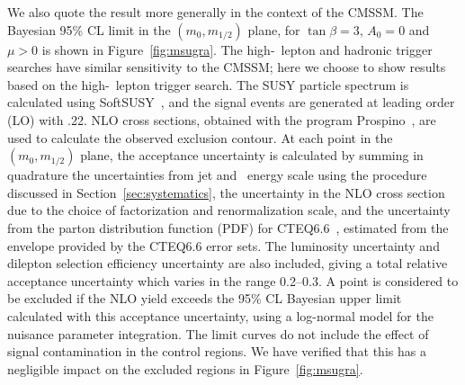 

We also quote the result more generally in the context of the CMSSM.
The Bayesian 95\% CL limit  in the  $(m_0,m_{1/2})$ plane,  for $\tan\beta=3$,
$A_0 = 0$ and $\mu > 0$ is shown in Figure~\ref{fig:msugra}. 
The high-\pt\ lepton and hadronic trigger searches have similar sensitivity to the CMSSM; 
here we choose to show results based on the high-\pt\ lepton trigger search. The
SUSY particle  spectrum is calculated using  SoftSUSY~\cite{Allanach:2002uq}, and the
signal  events  are  generated  at  leading  order  (LO)  with  .22.
NLO  cross sections,  obtained  with the
program  Prospino~\cite{Beenakker:1997kx},  are used  to  calculate  the observed
exclusion  contour.  
At each point in the  $(m_0,m_{1/2})$ plane, the acceptance uncertainty is calculated by
summing in quadrature the uncertainties from jet and \MET\ energy scale using the
procedure discussed in Section~\ref{sec:systematics}, the uncertainty in the 
NLO cross section due to the choice of factorization and renormalization scale, 
and the uncertainty from the parton distribution function (PDF) for CTEQ6.6~\cite{Nadolsky:2008fk},
estimated from  the  envelope  provided  by  the  CTEQ6.6  error sets.
The luminosity uncertainty and dilepton
selection efficiency uncertainty are also included, giving a total relative acceptance uncertainty which varies
in the range 0.2--0.3.
A point is considered to be excluded if the NLO yield exceeds the 95\% CL
Bayesian upper limit calculated with this acceptance uncertainty, using
a log-normal model for the nuisance parameter integration.
The limit curves do not include the effect of signal
contamination in the control regions.  We have verified that this
has a negligible impact on the excluded regions in Figure~\ref{fig:msugra}.

